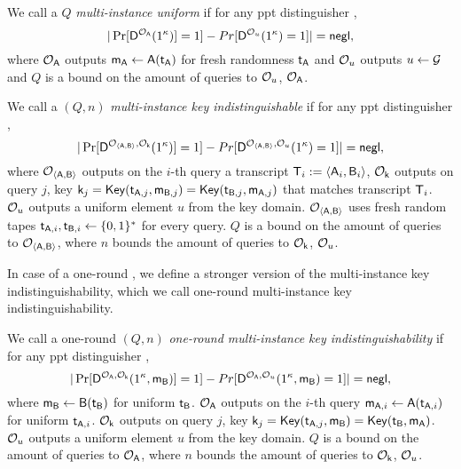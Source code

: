 \begin{definition}
We call a \UKA $Q$ \emph{multi-instance uniform} if for any ppt distinguisher \D,
$$
|\Pr[\mathsf D^{\mathcal{O}_{\mathsf{A}}}(1^{\kappa})]=1]-Pr[\mathsf D^{\mathcal{O}_{u}}(1^{\kappa})=1]|=\mathsf{negl},
$$
where $\mathcal{O}_{\mathsf{A}}$ outputs $\mathsf{m}_\mathsf{A}\leftarrow\mathsf{A}(\mathsf{t}_\mathsf{A})$ for fresh randomness $\mathsf{t}_\mathsf{A}$ and $\mathcal{O}_u$ outputs $u\leftarrow\mathcal{G}$ and $Q$ is a bound on the amount of queries to $\mathcal{O}_{u}$, $\mathcal{O}_{\mathsf{A}}$.
\end{definition}



\begin{definition}
We call a \UKA $(Q,n)$ \emph{multi-instance key indistinguishable} if for any ppt distinguisher \D,
$$
|\Pr[\mathsf D^{\mathcal{O}_{\langle \mathsf{A},\mathsf{B}\rangle}, \mathcal{O}_{\mathsf{k}}}(1^{\kappa})]=1]-Pr[\mathsf D^{\mathcal{O}_{\langle \mathsf{A},\mathsf{B}\rangle},\mathcal{O}_{u}}(1^{\kappa})=1]|=\mathsf{negl},
$$
where $\mathcal{O}_{\langle \mathsf{A},\mathsf{B}\rangle}$ outputs on the $i$-th query a transcript $\mathsf{T}_i:=\langle \mathsf{A}_i,\mathsf{B}_i\rangle$, $\mathcal{O}_{\mathsf{k}}$ outputs on query $j$, key $\mathsf{k}_j=\mathsf{Key}(\mathsf{t}_{\mathsf{A},j},\mathsf{m}_{\mathsf{B},j})=\mathsf{Key}(\mathsf{t}_{\mathsf{B},j},\mathsf{m}_{\mathsf{A},j})$ that matches transcript $\mathsf{T}_i$. $\mathcal{O}_u$ outputs a uniform element $u$ from the key domain. $\mathcal{O}_{\langle \mathsf{A},\mathsf{B}\rangle}$ uses fresh random tapes $\mathsf{t}_{\mathsf{A},i},\mathsf{t}_{\mathsf{B},i}\leftarrow\{0,1\}^*$ for every query. $Q$ is a bound on the amount of queries to $\mathcal{O}_{\langle \mathsf{A},\mathsf{B}\rangle}$, where $n$ bounds the amount of queries to $\mathcal{O}_{\mathsf{k}}$, $\mathcal{O}_{u}$. 
\end{definition}

In case of a one-round \UKA, we define a stronger version of the multi-instance key indistinguishability, which we call one-round multi-instance key indistinguishability.

\begin{definition}
We call a one-round \UKA $(Q,n)$ \emph{one-round multi-instance key indistinguishability} if for any ppt distinguisher \D,
$$
|\Pr[\mathsf D^{\mathcal{O}_{\mathsf{A}}, \mathcal{O}_{\mathsf{k}}}(1^{\kappa},\mathsf{m}_\mathsf{B})]=1]-Pr[\mathsf D^{\mathcal{O}_{\mathsf{A}},\mathcal{O}_{u}}(1^{\kappa},\mathsf{m}_\mathsf{B})=1]|=\mathsf{negl},
$$
where $\mathsf{m}_{\mathsf{B}}\leftarrow\mathsf{B}(\mathsf{t}_{\mathsf{B}})$ for uniform $\mathsf{t}_{\mathsf{B}}$. $\mathcal{O}_{\mathsf{A}}$ outputs on the $i$-th query $\mathsf{m}_{\mathsf{A},i}\leftarrow \mathsf{A}(\mathsf{t}_{\mathsf{A},i})$ for uniform $\mathsf{t}_{\mathsf{A},i}$. $\mathcal{O}_{\mathsf{k}}$ outputs on query $j$, key $\mathsf{k}_j=\mathsf{Key}(\mathsf{t}_{\mathsf{A},j},\mathsf{m}_{\mathsf{B}})=\mathsf{Key}(\mathsf{t}_{\mathsf{B}},\mathsf{m}_{\mathsf{A}})$. $\mathcal{O}_u$ outputs a uniform element $u$ from the key domain. $Q$ is a bound on the amount of queries to $\mathcal{O}_{\mathsf{A}}$, where $n$ bounds the amount of queries to $\mathcal{O}_{\mathsf{k}}$, $\mathcal{O}_{u}$. 
\end{definition}

